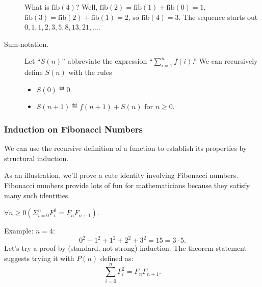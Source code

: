 \begin{definition}
\begin{description}
What is $\text{fib}(4)$?  Well, $\text{fib}(2) =
\text{fib}(1)+\text{fib}(0) = 1$, $\text{fib}(3) =
\text{fib}(2)+\text{fib}(1) = 2$, so $\text{fib}(4) = 3$.  The sequence
starts out $0, 1, 1, 2, 3, 5, 8, 13, 21,\dots$.


\item[Sum-notation.]  Let ``$S(n)$'' abbreviate the expression
``$\sum_{i=1}^n f(i)$.''  We can recursively define $S(n)$ with the rules
  \begin{itemize}
  \item $S(0) \eqdef 0$.
  \item $S(n+1) \eqdef  f(n+1) + S(n)$ for $n\geq 0$.
  \end{itemize}

\end{description}

\iffalse

\subsubsection{Induction on Fibonacci Numbers}

We can use the recursive definition of a function to establish its
properties by structural induction.

As an illustration, we'll prove a cute identity involving Fibonacci
numbers.  Fibonacci numbers provide lots of fun for mathematicians because
they satisfy many such identities.
\begin{proposition}
  $\forall n \geq 0 (\Sigma_{i=0}^n F_i^2 = F_n F_{n+1})$.
\end{proposition}

Example: $n = 4$:
\[
0^2 + 1^2 + 1^2 + 2^2 + 3^2 = 15 = 3 \cdot 5.
\]
Let's try a proof by (standard, not strong) induction.  The theorem
statement suggests trying it with $P(n)$ defined as:
\[
\sum_{i=0}^n F_i^2 = F_n F_{n+1}.
\]


\end{definition}
